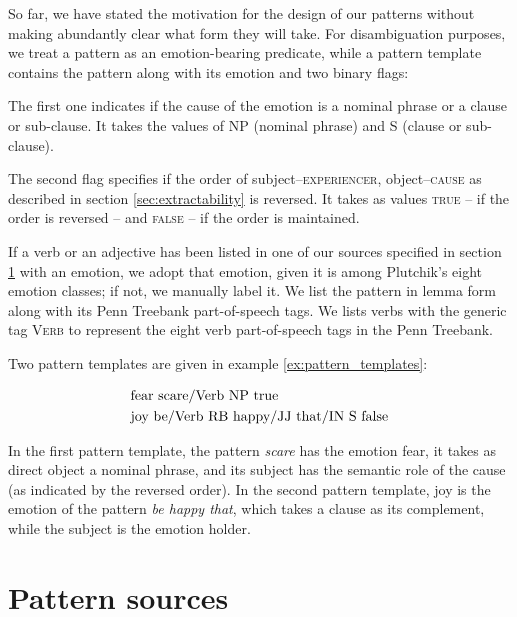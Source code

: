 So far, we have stated the motivation for the design of our patterns without making abundantly clear what form they will take. For disambiguation purposes, we treat a pattern as an emotion-bearing predicate, while a pattern template contains the pattern along with its emotion and two binary flags:
\begin{aenumerate}[noitemsep]
	\item The first one indicates if the cause of the emotion is a nominal phrase or a clause or sub-clause. It takes the values of \textsc{NP} (nominal phrase) and \textsc{S} (clause or sub-clause).
	\item The second flag specifies if the order of subject--\textsc{experiencer}, object--\textsc{cause} as described in section \ref{sec:extractability} is reversed. It takes as values \textsc{true} -- if the order is reversed -- and \textsc{false} -- if the order is maintained.
\end{aenumerate}

If a verb or an adjective has been listed in one of our sources specified in section \ref{sec:pattern_sources} with an emotion, we adopt that emotion, given it is among Plutchik's eight emotion classes; if not, we manually label it. We list the pattern in lemma form along with its Penn Treebank part-of-speech tags. We lists verbs with the generic tag \textsc{Verb} to represent the eight verb part-of-speech tags in the Penn Treebank.

Two pattern templates are given in example \ref{ex:pattern_templates}:

\begin{align}
\begin{split}\label{ex:pattern_templates}
&\textnormal{fear	scare/Verb	NP	true}\\
&\textnormal{joy	be/Verb RB happy/JJ that/IN	S	false}
\end{split}
\end{align}

In the first pattern template, the pattern \textit{scare} has the emotion fear, it takes as direct object a nominal phrase, and its subject has the semantic role of the cause (as indicated by the reversed order). In the second pattern template, joy is the emotion of the pattern \textit{be happy that}, which takes a clause as its complement, while the subject is the emotion holder.

\section{Pattern sources} \label{sec:pattern_sources}

